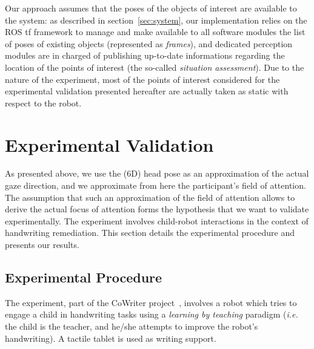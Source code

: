 \documentclass{sig-alternate}
\newcommand{\ie}{\textit{i.e.}\xspace}
\begin{document}
Our approach assumes that the poses of the objects of interest are available to
the system: as described in section~\ref{sec:system}, our implementation relies
on the ROS {\sc tf} framework to manage and make available to all software
modules the list of poses of existing objects (represented as {\it frames}), and
dedicated perception modules are in charged of publishing up-to-date
informations regarding the location of the points of interest (the so-called
\emph{situation assessment}). Due to the nature of the experiment, most of the
points of interest considered for the experimental validation presented
hereafter are actually taken as static with respect to the robot.


\section{Experimental Validation}
\label{sec:expe}

As presented above, we use the (6D) head pose as an approximation of the
actual gaze direction, and we approximate from here the participant's field of
attention. The assumption that such an approximation of the field of attention
allows to derive the actual focus of attention forms the hypothesis that we
want to validate experimentally. The experiment involves child-robot
interactions in the context of handwriting remediation.
This section details the experimental procedure and presents our results.


\subsection{Experimental Procedure}

The experiment, part of the CoWriter project~\cite{Hood:2015}, involves a robot
which tries to engage a child in handwriting tasks using a \emph{learning by teaching}
paradigm (\ie the child is the teacher, and he/she attempts to improve the
robot's handwriting). A tactile tablet is used as writing support.
\end{document}
